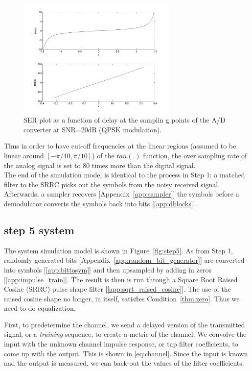 \documentclass[]{article}
\begin{document}
\begin{figure}[H]
\centering
\hspace*{-2cm}\includegraphics[width=0.7\textwidth]{tan_graph.jpg}
\caption{SER plot as a function of delay at the samplin g points of the A/D converter at SNR=20dB (QPSK modulation). \label{fig:delay}}
\end{figure} 

Thus in order to have cut-off frequencies at the linear regions (assumed to be linear around $\left[ -\pi/10,\pi/10 \right] $) of the $tan(.)$ function, the over sampling rate of the analog signal is set to 80 times more than the digital signal. \\



The end of the simulation model is identical to the process in Step 1: a matched filter to the SRRC picks out the symbols from the noisy received signal.  Afterwards, a sampler recovers [Appendix~\ref{app:sampler}] the symbols before a demodulator converts the symbols back into bits [\ref{app:dblocks}].  

\subsection{step 5 system}
\label{sec:system5}
The system simulation model is shown in Figure~\ref{fig:step5}.  As from Step 1, randomly generated bits [Appendix~\ref{app:random_bit_generator}] are converted into symbols [\ref{app:bittosym}] and then upsampled by adding in zeros [\ref{app:impulse_train}].  The result is then is run through a Square Root Raised Cosine (SRRC) pulse shape filter [\ref{app:sqrt_raised_cosine}].  The use of the raised cosine shape no longer, in itself, satisfies Condition~\ref{thm:zero}.  Thus we need to do equalization.

First, to predetermine the channel, we send a delayed version of the transmitted signal, or a \emph{training} sequence, to create a metric of the channel.  We convolve the input with the unknown channel impulse response, or tap filter coefficients, to come up with the output.  This is shown in \ref{eq:channel}.  Since the input is known and the output is measured, we can back-out the values of the filter coefficients.  \\
\end{document}
